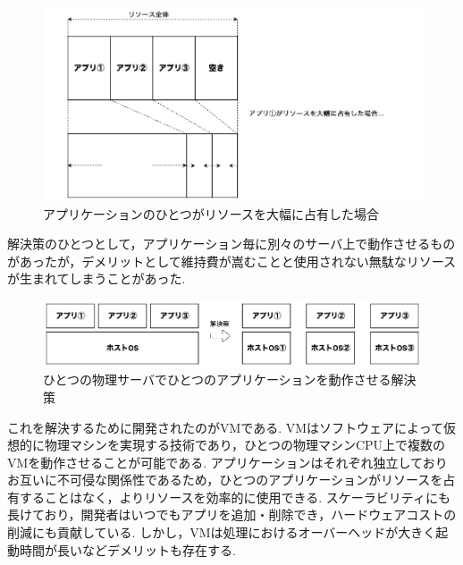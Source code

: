 \begin{figure}[htbp]
\begin{center}
    \includegraphics[width=\textwidth]{./figures/resource-on-physical-server.jpg}
    \caption{アプリケーションのひとつがリソースを大幅に占有した場合}
\end{center}
\end{figure}

解決策のひとつとして，アプリケーション毎に別々のサーバ上で動作させるものがあったが，デメリットとして維持費が嵩むことと使用されない無駄なリソースが生まれてしまうことがあった.

\begin{figure}[htbp]
\begin{center}
    \includegraphics[width=\textwidth]{./figures/only-on-physical-server.jpg}
    \caption{ひとつの物理サーバでひとつのアプリケーションを動作させる解決策}
\end{center}
\end{figure}

これを解決するために開発されたのがVMである.
VMはソフトウェアによって仮想的に物理マシンを実現する技術であり，ひとつの物理マシンCPU上で複数のVMを動作させることが可能である.
アプリケーションはそれぞれ独立しておりお互いに不可侵な関係性であるため，ひとつのアプリケーションがリソースを占有することはなく，よりリソースを効率的に使用できる.
スケーラビリティにも長けており，開発者はいつでもアプリを追加・削除でき，ハードウェアコストの削減にも貢献している.
しかし，VMは処理におけるオーバーヘッドが大きく起動時間が長いなどデメリットも存在する.

